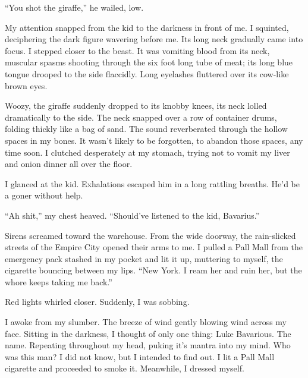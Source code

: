 ``You shot the giraffe,'' he wailed, low.



My attention snapped from the kid to the darkness in front of me. I
squinted, deciphering the dark figure wavering before me. Its long
neck gradually came into focus. I stepped closer to the beast. It
was vomiting blood from its neck, muscular spasms shooting through
the six foot long tube of meat; its long blue tongue drooped to the
side flaccidly. Long eyelashes fluttered over its cow-like brown
eyes.



Woozy, the giraffe suddenly dropped to its knobby knees, its neck
lolled dramatically to the side. The neck snapped over a row of
container drums, folding thickly like a bag of sand. The sound
reverberated through the hollow spaces in my bones. It wasn't
likely to be forgotten, to abandon those spaces, any time soon. I
clutched desperately at my stomach, trying not to vomit my liver
and onion dinner all over the floor.



I glanced at the kid. Exhalations escaped him in a long rattling
breaths. He'd be a goner without help.



``Ah shit,'' my chest heaved. ``Should've listened
to the kid, Bavarius.''



Sirens screamed toward the warehouse. From the wide doorway, the
rain-slicked streets of the Empire City opened their arms to me. I
pulled a Pall Mall from the emergency pack stashed in my pocket and
lit it up, muttering to myself, the cigarette bouncing between my
lips. ``New York. I ream her and ruin her, but the whore keeps
taking me back.''



Red lights whirled closer. Suddenly, I was sobbing. 

 





I awoke from my slumber. The breeze of wind gently blowing wind
across my face. Sitting in the darkness, I thought of only one
thing: Luke Bavarious. The name. Repeating throughout my head,
puking it's mantra into my mind. Who was this man? I did not know,
but I intended to find out. I lit a Pall Mall cigarette and
proceeded to smoke it. Meanwhile, I dressed myself.




